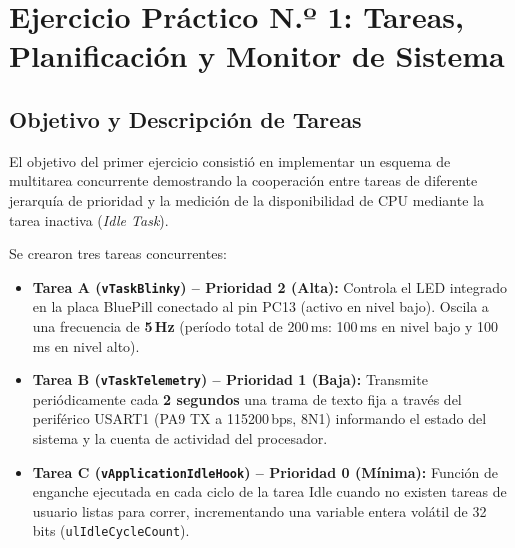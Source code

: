 \documentclass{plantilla}
\begin{document}
\section{Ejercicio Práctico N.º 1: Tareas, Planificación y Monitor de Sistema}

\subsection{Objetivo y Descripción de Tareas}
El objetivo del primer ejercicio consistió en implementar un esquema de multitarea concurrente demostrando la cooperación entre tareas de diferente jerarquía de prioridad y la medición de la disponibilidad de CPU mediante la tarea inactiva (\textit{Idle Task}).

Se crearon tres tareas concurrentes:
\begin{itemize}
    \item \textbf{Tarea A (\texttt{vTaskBlinky}) -- Prioridad 2 (Alta):} Controla el LED integrado en la placa BluePill conectado al pin PC13 (activo en nivel bajo). Oscila a una frecuencia de \textbf{5\,Hz} (período total de 200\,ms: 100\,ms en nivel bajo y 100\,ms en nivel alto).
    \item \textbf{Tarea B (\texttt{vTaskTelemetry}) -- Prioridad 1 (Baja):} Transmite periódicamente cada \textbf{2 segundos} una trama de texto fija a través del periférico USART1 (PA9 TX a 115200\,bps, 8N1) informando el estado del sistema y la cuenta de actividad del procesador.
    \item \textbf{Tarea C (\texttt{vApplicationIdleHook}) -- Prioridad 0 (Mínima):} Función de enganche ejecutada en cada ciclo de la tarea Idle cuando no existen tareas de usuario listas para correr, incrementando una variable entera volátil de 32 bits (\texttt{ulIdleCycleCount}).
\end{itemize}
\end{document}
